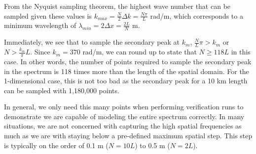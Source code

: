 From the Nyquist sampling theorem, the highest wave number that can be sampled given these values is $k_{max} = \frac{N}{2}\Delta k = \frac{N\pi}{L}$ rad/m, which corresponds to a minimum wavelength of $\lambda_{min} = 2\Delta x = \frac{2L}{N}$ m.

Immediately, we see that to sample the secondary peak at $k_m$, $\frac{N}{L}\pi > k_m$ or $N > \frac{k_m}{\pi}L$. Since $k_m = 370$ rad/m, we can round up to state that $N \geq 118L$ in this case. In other words, the number of points required to sample the secondary peak in the spectrum is 118 times more than the length of the spatial domain. For the 1-dimensional case, this is not too bad as the secondary peak for a 10 km length can be sampled with 1,180,000 points. 

In general, we only need this many points when performing verification runs to demonstrate we are capable of modeling the entire spectrum correctly. In many situations, we are not concerned with capturing the high spatial frequencies as much as we are with staying below a pre-defined maximum spatial step. This step is typically on the order of 0.1 m ($N = 10L$) to 0.5 m ($N = 2L$).

